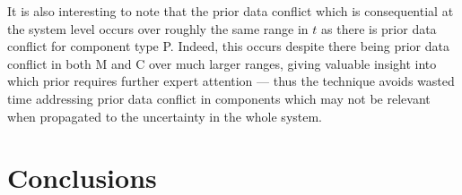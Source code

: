 \documentclass[12pt, a4paper]{elsarticle}
\newcommand{\Rsys}{R_\text{sys}}
\begin{document}
It is also interesting to note that the prior data conflict 
which is consequential at the system level occurs over 
roughly the same range in $t$ as there is prior data 
conflict for component type P.  Indeed, this occurs despite there being 
prior data conflict in both M and C over much larger ranges, 
giving valuable insight into which prior requires further 
expert attention --- thus the technique avoids wasted time 
addressing prior data conflict in components which may not 
be relevant when propagated to the uncertainty in the whole system.



%


\section{Conclusions}
\end{document}
